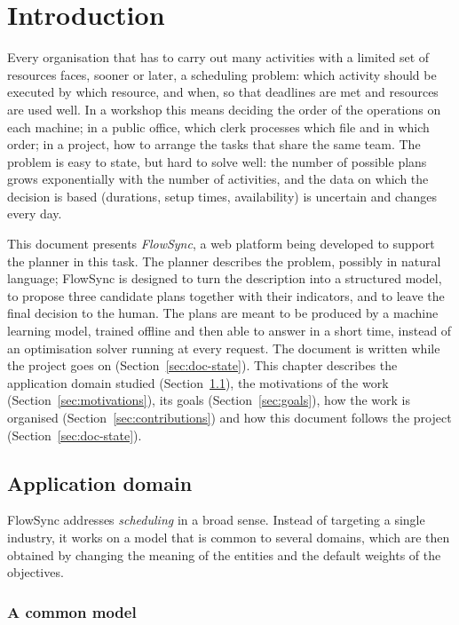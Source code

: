\chapter{Introduction}
\label{chap:intro}

Every organisation that has to carry out many activities with a limited set of resources faces,
sooner or later, a scheduling problem: which activity should be executed by which resource, and
when, so that deadlines are met and resources are used well. In a workshop this means deciding
the order of the operations on each machine; in a public office, which clerk processes which
file and in which order; in a project, how to arrange the tasks that share the same team. The
problem is easy to state, but hard to solve well: the number of possible plans grows
exponentially with the number of activities, and the data on which the decision is based
(durations, setup times, availability) is uncertain and changes every day.

This document presents \emph{FlowSync}, a web platform being developed to support the planner
in this task. The planner describes the problem, possibly in natural language; FlowSync is
designed to turn the description into a structured model, to propose three candidate plans
together with their indicators, and to leave the final decision to the human. The plans are meant
to be produced by a machine learning model, trained offline and then able to answer in a short
time, instead of an optimisation solver running at every request. The document is written while
the project goes on (Section~\ref{sec:doc-state}). This chapter describes the application domain studied
(Section~\ref{sec:domain}), the motivations of the work (Section~\ref{sec:motivations}), its
goals (Section~\ref{sec:goals}), how the work is organised (Section~\ref{sec:contributions}) and
how this document follows the project (Section~\ref{sec:doc-state}).

\section{Application domain}
\label{sec:domain}

FlowSync addresses \emph{scheduling} in a broad sense. Instead of targeting a single industry, it
works on a model that is common to several domains, which are then obtained by changing the
meaning of the entities and the default weights of the objectives.

\subsection{A common model}
\label{sec:common-model}

